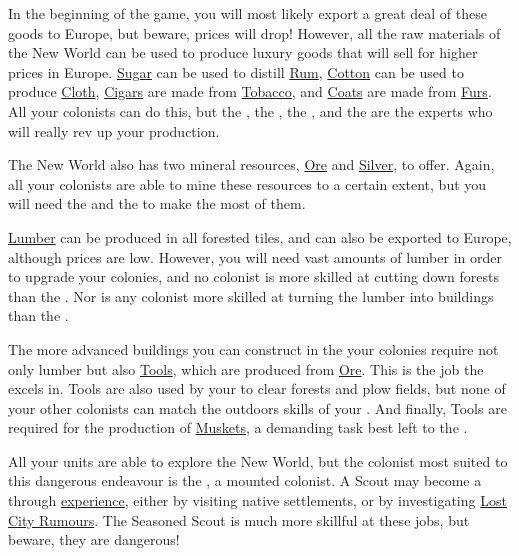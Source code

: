 \documentclass[12pt]{book}
\begin{document}
In the beginning of the game, you will most likely export a great deal
of these goods to Europe, but beware, prices will drop! However, all
the raw materials of the New World can be used to produce luxury goods
that will sell for higher prices in Europe. \hyperlink{Sugar}{Sugar}
can be used to distill \hyperlink{Rum}{Rum},
\hyperlink{Cotton}{Cotton} can be used to produce
\hyperlink{Cloth}{Cloth}, \hyperlink{Cigars}{Cigars} are made from
\hyperlink{Tobacco}{Tobacco}, and \hyperlink{Coats}{Coats} are made
from \hyperlink{Furs}{Furs}. All your colonists can do this, but the
, the , the , and the  are the experts who
will really rev up your production.

The New World also has two mineral resources, \hyperlink{Ore}{Ore} and
\hyperlink{Silver}{Silver}, to offer. Again, all your colonists are
able to mine these resources to a certain extent, but you will need
the  and the  to make
the most of them.

\hyperlink{Lumber}{Lumber} can be produced in all forested tiles, and
can also be exported to Europe, although prices are low. However, you
will need vast amounts of lumber in order to upgrade your colonies,
and no colonist is more skilled at cutting down forests than the
. Nor is any colonist more skilled at turning
the lumber into buildings than the .

The more advanced buildings you can construct in the your colonies
require not only lumber but also \hyperlink{Tools}{Tools}, which are
produced from \hyperlink{Ore}{Ore}. This is the job the  excels in.  Tools are also used by your  to
clear forests and plow fields, but none of your other colonists can
match the outdoors skills of your . And finally,
Tools are required for the production of \hyperlink{Muskets}{Muskets},
a demanding task best left to the .

All your units are able to explore the New World, but the colonist
most suited to this dangerous endeavour is the , a mounted
colonist. A Scout may become a  through
\hyperlink{Skills and Education}{experience}, either by visiting
native settlements, or by investigating \hyperlink{Lost City
Rumours}{Lost City Rumours}. The Seasoned Scout is much more skillful
at these jobs, but beware, they are dangerous!
\end{document}
